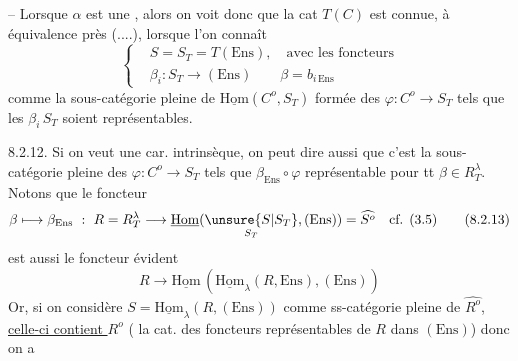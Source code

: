 -- Lorsque $\alpha$ est une , alors on voit donc que la cat
 $T(C)$ est connue, à équivalence près (....), lorsque
l'on connaît
\[
\left\{\begin{aligned}
&S=S_T=T(\mathrm{Ens}),\quad\text{avec les foncteurs}\\
&\beta_i:S_T\longrightarrow(\mathrm{Ens})\qquad\beta=b_{i\,\mathrm{Ens}}
\end{aligned}\right.\tag*{(8.2.11)}
\]
comme la sous-catégorie pleine de $\underline{\mathrm{Hom}}(C^o,S_T)$ formée des
$\varphi:C^o\longrightarrow S_T$ tels que les $\beta_i\,S_T$ soient représentables.

8.2.12. Si on veut une car. intrinsèque, on peut dire aussi que
c'est la sous-catégorie pleine des $\varphi:C^o\longrightarrow S_T$ tels que
$\beta_{\mathrm{Ens}}\circ\varphi$ représentable pour tt $\beta\in R_T^\lambda$. Notons que le foncteur
\[
 \beta\longmapsto\beta_{\mathrm{Ens}}\ :\ R=R_T^\lambda\longrightarrow
 \underline{\mathrm{Hom}}(\underset{S_T}{\unsure{S|S_T}},(\mathrm{Ens}))=\widehat{S^o}\quad\text{cf. (3.5)}\tag*{(8.2.13)}
\]
est aussi le foncteur évident
\[
 R\longrightarrow\underline{\mathrm{Hom}}\,(\underline{\mathrm{Hom}}_\lambda(R,\mathrm{Ens}),(\mathrm{Ens}))\tag*{(8.2.14)}
\]
Or, si on considère $S=\underline{\mathrm{Hom}}_\lambda(R,(\mathrm{Ens}))$ comme ss-catégorie
pleine de $\widehat{R^o}$, \uline{celle-ci contient $R^o$} ( la cat. des foncteurs
représentables de $R$ dans $(\mathrm{Ens})$) donc on a 
